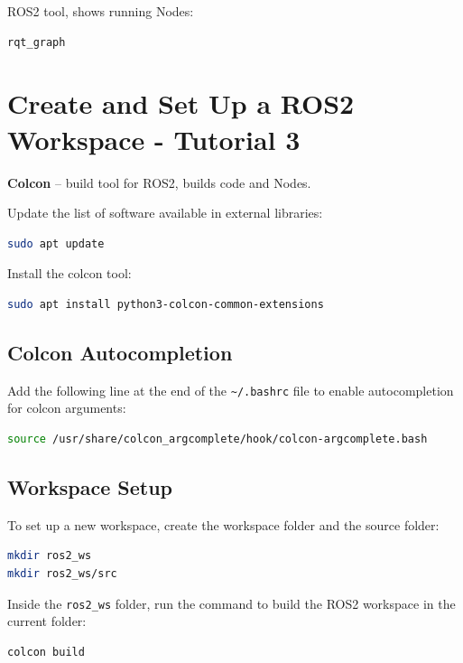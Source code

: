\documentclass{article}
\newcommand{\code}[1]{\colorbox{codeBg}{\texttt{#1}}}
\begin{document}
ROS2 tool, shows running Nodes:
\begin{lstlisting}[style=bashStyle, language=bash]
rqt_graph
\end{lstlisting}

\newpage

\section{Create and Set Up a ROS2 Workspace - Tutorial 3}

\textbf{Colcon} -- build tool for ROS2, builds code and Nodes.

\vspace{0.3cm}
\noindent Update the list of software available in external libraries:
\begin{lstlisting}[style=bashStyle, language=bash]
sudo apt update
\end{lstlisting}

\noindent Install the colcon tool:
\begin{lstlisting}[style=bashStyle, language=bash]
sudo apt install python3-colcon-common-extensions
\end{lstlisting}

\subsection*{Colcon Autocompletion}

Add the following line at the end of the \code{\textasciitilde/.bashrc} file to enable autocompletion for colcon arguments:
\begin{lstlisting}[style=bashStyle, language=bash]
source /usr/share/colcon_argcomplete/hook/colcon-argcomplete.bash
\end{lstlisting}

\subsection*{Workspace Setup}

To set up a new workspace, create the workspace folder and the source folder:
\begin{lstlisting}[style=bashStyle, language=bash]
mkdir ros2_ws
mkdir ros2_ws/src
\end{lstlisting}

\vspace{0.3cm}
\noindent Inside the \code{ros2\_ws} folder, run the command to build the ROS2 workspace in the current folder:
\begin{lstlisting}[style=bashStyle, language=bash]
colcon build
\end{lstlisting}
\end{document}
